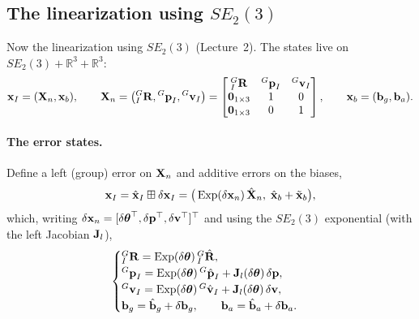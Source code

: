 \subsection{The linearization using \texorpdfstring{$SE_2(3)$}{SE2(3)}}

Now the linearization using $SE_2(3)$ (Lecture~2). The states live on $SE_2(3) + \mathbb{R}^3 + \mathbb{R}^3$:
\begin{align}
\vect{x}_I = (\vect{X}_n, \vect{x}_b), \qquad
\vect{X}_n = \big({}^{G}_{I}\vect{R}, {}^{G}\vect{p}_I, {}^{G}\vect{v}_I\big) =
\begin{bmatrix}
{}^{G}_{I}\vect{R} & {}^{G}\vect{p}_I & {}^{G}\vect{v}_I \\
\vect{0}_{1\times3} & 1 & 0 \\
\vect{0}_{1\times3} & 0 & 1
\end{bmatrix},
\qquad
\vect{x}_b = (\vect{b}_g, \vect{b}_a).
\end{align}

\paragraph{The error states.} Define a left (group) error on $\vect{X}_n$ and additive errors on the biases,
\begin{align}
\vect{x}_I = \hat{\vect{x}}_I \boxplus \delta\vect{x}_I = \big(\Exp(\delta\vect{x}_n)\,\hat{\vect{X}}_n,\; \hat{\vect{x}}_b + \tilde{\vect{x}}_b\big),
\end{align}
which, writing $\delta\vect{x}_n = [\delta\vect{\theta}\trans, \delta\vect{p}\trans, \delta\vect{v}\trans]\trans$ and using the $SE_2(3)$ exponential (with the left Jacobian $\vect{J}_l$),
\begin{align}
\begin{cases}
{}^{G}_{I}\vect{R} = \Exp(\delta\vect{\theta})\,{}^{G}_{I}\hat{\vect{R}}, \\
{}^{G}\vect{p}_I = \Exp(\delta\vect{\theta})\,{}^{G}\hat{\vect{p}}_I + \vect{J}_l(\delta\vect{\theta})\,\delta\vect{p}, \\
{}^{G}\vect{v}_I = \Exp(\delta\vect{\theta})\,{}^{G}\hat{\vect{v}}_I + \vect{J}_l(\delta\vect{\theta})\,\delta\vect{v}, \\
\vect{b}_g = \hat{\vect{b}}_g + \delta\vect{b}_g, \qquad \vect{b}_a = \hat{\vect{b}}_a + \delta\vect{b}_a.
\end{cases}
\end{align}

